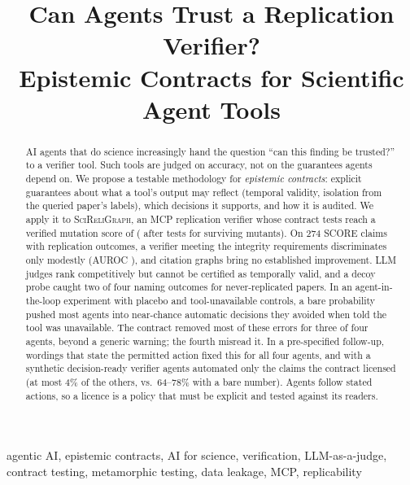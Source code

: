 \documentclass[conference]{IEEEtran}
\begin{document}

\title{Can Agents Trust a Replication Verifier?\\
Epistemic Contracts for Scientific Agent Tools}

\author{
}

\maketitle

\begin{abstract}
AI agents that do science increasingly hand the question ``can this finding be trusted?'' to a verifier tool. Such tools are judged on accuracy, not on the guarantees agents depend on. We propose a testable methodology for \emph{epistemic contracts}: explicit guarantees about what a tool's output may reflect (temporal validity, isolation from the queried paper's labels), which decisions it supports, and how it is audited. We apply it to \textsc{SciReliGraph}, an MCP replication verifier whose contract tests reach a verified mutation score of \mutVoneScore{} (\mutVthreeScore{} after tests for surviving mutants). On 274 SCORE claims with replication outcomes, a verifier meeting the integrity requirements discriminates only modestly (AUROC \aucBone{}), and citation graphs bring no established improvement. LLM judges rank competitively but cannot be certified as temporally valid, and a decoy probe caught two of four naming outcomes for never-replicated papers. In an agent-in-the-loop experiment with placebo and tool-unavailable controls, a bare probability pushed most agents into near-chance automatic decisions they avoided when told the tool was unavailable. The contract removed most of these errors for three of four agents, beyond a generic warning; the fourth misread it. In a pre-specified follow-up, wordings that state the permitted action fixed this for all four agents, and with a synthetic decision-ready verifier agents automated only the claims the contract licensed (at most 4\% of the others, vs.\ 64--78\% with a bare number). Agents follow stated actions, so a licence is a policy that must be explicit and tested against its readers.
\end{abstract}

\begin{IEEEkeywords}
agentic AI, epistemic contracts, AI for science, verification, LLM-as-a-judge, contract testing, metamorphic testing, data leakage, MCP, replicability
\end{IEEEkeywords}
\end{document}
